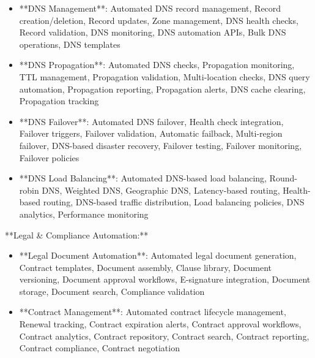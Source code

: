 \documentclass[11pt,a4paper]{article}
\begin{document}
\begin{itemize}
\item **DNS Management**: Automated DNS record management, Record creation/deletion, Record updates, Zone management, DNS health checks, Record validation, DNS monitoring, DNS automation APIs, Bulk DNS operations, DNS templates
\end{itemize}

\begin{itemize}
\item **DNS Propagation**: Automated DNS checks, Propagation monitoring, TTL management, Propagation validation, Multi-location checks, DNS query automation, Propagation reporting, Propagation alerts, DNS cache clearing, Propagation tracking
\end{itemize}

\begin{itemize}
\item **DNS Failover**: Automated DNS failover, Health check integration, Failover triggers, Failover validation, Automatic failback, Multi-region failover, DNS-based disaster recovery, Failover testing, Failover monitoring, Failover policies
\end{itemize}

\begin{itemize}
\item **DNS Load Balancing**: Automated DNS-based load balancing, Round-robin DNS, Weighted DNS, Geographic DNS, Latency-based routing, Health-based routing, DNS-based traffic distribution, Load balancing policies, DNS analytics, Performance monitoring
\end{itemize}

**Legal \& Compliance Automation:**

\begin{itemize}
\item **Legal Document Automation**: Automated legal document generation, Contract templates, Document assembly, Clause library, Document versioning, Document approval workflows, E-signature integration, Document storage, Document search, Compliance validation
\end{itemize}

\begin{itemize}
\item **Contract Management**: Automated contract lifecycle management, Renewal tracking, Contract expiration alerts, Contract approval workflows, Contract analytics, Contract repository, Contract search, Contract reporting, Contract compliance, Contract negotiation
\end{itemize}
\end{document}
